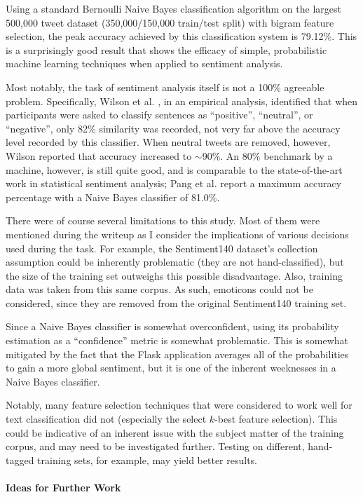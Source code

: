 \documentclass[letter,12pt]{article}
\begin{document}
Using a standard Bernoulli Naive Bayes classification algorithm on the largest
500,000 tweet dataset (350,000/150,000 train/test split) with bigram feature
selection, the peak accuracy achieved by this classification system is 79.12\%.
This is a surprisingly good result that shows the efficacy of simple,
probabilistic machine learning techniques when applied to sentiment analysis.

Most notably, the task of sentiment analysis itself is
not a 100\% agreeable problem.  Specifically, Wilson et al. \cite{wilson05}, in
an empirical analysis, identified that when participants were asked to classify
sentences as ``positive'', ``neutral'', or ``negative'', only 82\% similarity
was recorded, not very far above the accuracy level recorded by this
classifier. When neutral tweets are removed, however, Wilson reported that
accuracy increased to $\sim$90\%. An $80\%$ benchmark by a machine, however, is
still quite good, and is comparable to the state-of-the-art work in statistical
sentiment analysis; Pang et al. \cite{pang02} report a maximum accuracy
percentage with a Naive Bayes classifier of 81.0\%.

There were of course several limitations to this study. Most of them were
mentioned during the writeup as I consider the implications of various
decisions used during the task. For example, the Sentiment140 dataset's
collection assumption could be inherently problematic (they are not
hand-classified), but the size of the training set outweighs this possible
disadvantage. Also, training data was taken from this same corpus. As such,
emoticons could not be considered, since they are removed from the original
Sentiment140 training set.

Since a Naive Bayes classifier is somewhat overconfident, using its probability
estimation as a ``confidence'' metric is somewhat problematic. This is somewhat
mitigated by the fact that the Flask application averages all of the
probabilities to gain a more global sentiment, but it is one of the inherent
weeknesses in a Naive Bayes classifier.

Notably, many feature selection techniques that were considered to work well
for text classification did not (especially the select $k$-best feature
selection). This could be indicative of an inherent issue with the subject
matter of the training corpus, and may need to be investigated further. Testing
on different, hand-tagged training sets, for example, may yield better results.

\paragraph{Ideas for Further Work}
\end{document}
